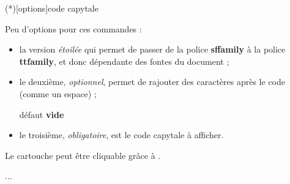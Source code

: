 \documentclass[a4paper,french,11pt]{article}
\newcommand\ctex[1]{\tcbox[vignettelatex]{#1}}
\newcommand\Cle[1]{{\bfseries\sffamily\textlangle #1\textrangle}}
\begin{document}
\begin{codetex}
\CartoucheCapytale(*)[options]{code capytale}
\end{codetex}

\begin{codecles}
Peu d'options pour ces commandes :

\begin{itemize}
	\item la version \textit{étoilée} qui permet de  passer de la police \Cle{sffamily} à la police \Cle{ttfamily}, et donc dépendante des fontes du document ;
	\item le deuxième, \textit{optionnel}, permet de rajouter des caractères après le code (comme un \textsf{espace}) ;
	
	\hfill{}défaut \Cle{vide}
	\item le troisième, \textit{obligatoire}, est le \textsf{code capytale} à afficher.
\end{itemize}
\end{codecles}

\begin{codetex}



\end{codetex}

\begin{codesortie}



\end{codesortie}

\begin{codeinfo}
Le \textsf{cartouche} peut être \og cliquable \fg{} grâce à \ctex{href}.
\end{codeinfo}

\begin{codetex}
\usepackage{hyperref}
...
\href{https://capytale2.ac-paris.fr/web/c/abcd-12345}{}
\end{codetex}

\begin{codesortie}
\href{https://capytale2.ac-paris.fr/web/c/abcd-12345}{}
\end{codesortie}
\end{document}
